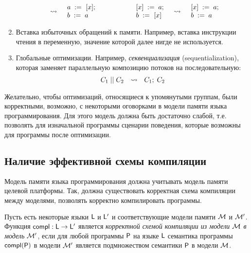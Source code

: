 \begin{enumerate}
\[\begin{array}{c c c}
\begin{array}{l c l}
\begin{array}{l}
        \end{array}
        & \rightsquigarrow &
        \begin{array}{l}
        a \;:=_{}\;[x]; \\
        b\;:=\;a
        \end{array}
      \end{array}
      & \qquad &
      \begin{array}{l c l}
        \begin{array}{l}
        [x]\;:=\;a; \\
        b \;:=_{}\;[x]
        \end{array}
        & \rightsquigarrow &
        \begin{array}{l}
        [x]\;:=\;a; \\
        b\;:=\;a
        \end{array}
      \end{array}
    \end{array}
    \]
  \item Вставка избыточных обращений к памяти. Например, вставка инструкции чтения в переменную,
    значение которой далее нигде не используется.
  \item Глобальные оптимизации. Например, \emph{секвенциализация} (sequentialization),
    которая заменяет параллельную композицию потоков на последовательную:
    \[
      \begin{array}{l c l}
      C_1\;||\;C_2 & \rightsquigarrow & C_1;\;C_2
      \end{array}
    \]
\end{enumerate}

Желательно, чтобы оптимизаций, относящиеся к упомянутыми группам, были корректными, возможно, с некоторыми оговорками
в модели памяти языка программирования.
Для этого модель должна быть достаточно слабой, т.е. позволять для изначальной программы сценарии поведения, которые
возможны для программы после оптимизации.

\subsection{Наличие эффективной схемы компиляции}
\label{sec:overview:effcompl}
Модель памяти языка программирования должна учитывать модель памяти целевой платформы.
Так, должна существовать корректная схема компиляции между моделями, позволять корректно компилировать программы.

\begin{definition}
Пусть есть некоторые языки $\mathsf{L}$ и $\mathsf{L'}$ и соответствующие модели памяти $\mathcal{M}$ и $\mathcal{M'}$.
Функция $\mathsf{compl} : \mathsf{L} \rightarrow \mathsf{L'}$ является \emph{корректной схемой компиляции из модели $\mathcal{M}$ в модель $\mathcal{M'}$},
если для любой программы $\mathsf{P}$ на языке $\mathsf{L}$ семантика программы $\mathsf{compl}(\mathsf{P})$ в модели $\mathcal{M'}$ является подмножеством
семантики $\mathsf{P}$ в модели $\mathcal{M}$.
\end{definition}

